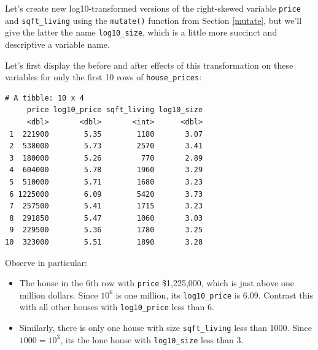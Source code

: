 \documentclass[12pt, krantz2,]{krantz}
\makeatletter
\newenvironment{Shaded}{\begin{snugshade}}{\end{snugshade}}
\newcommand{\DataTypeTok}[1]{\textcolor[rgb]{0.27,0.27,0.27}{#1}}
\newcommand{\KeywordTok}[1]{\textcolor[rgb]{0.27,0.27,0.27}{\textbf{#1}}}
\newcommand{\NormalTok}[1]{#1}
\newcommand{\OperatorTok}[1]{\textcolor[rgb]{0.43,0.43,0.43}{\textbf{#1}}}
\newcommand{\StringTok}[1]{\textcolor[rgb]{0.5,0.5,0.5}{#1}}
\providecommand{\tightlist}{%
  \setlength{\itemsep}{0pt}\setlength{\parskip}{0pt}}
\newenvironment{kframe}{%
\medskip{}
\setlength{\fboxsep}{.8em}
 \def\at@end@of@kframe{}%
 \ifinner\ifhmode%
  \def\at@end@of@kframe{\end{minipage}}%
  \begin{minipage}{\columnwidth}%
 \fi\fi%
 \def\FrameCommand##1{\hskip\@totalleftmargin \hskip-\fboxsep
 \colorbox{shadecolor}{##1}\hskip-\fboxsep
     \hskip-\linewidth \hskip-\@totalleftmargin \hskip\columnwidth}%
 \MakeFramed {\advance\hsize-\width
   \@totalleftmargin\z@ \linewidth\hsize
   \@setminipage}}%
 {\par\unskip\endMakeFramed%
 \at@end@of@kframe}
\renewenvironment{Shaded}{\begin{kframe}}{\end{kframe}}
\makeatother
\begin{document}
Let's create new log10-transformed versions of the right-skewed variable \texttt{price} and \texttt{sqft\_living} using the \texttt{mutate()} function from Section \ref{mutate}, but we'll give the latter the name \texttt{log10\_size}, which is a little more succinct and descriptive a variable name.

\begin{Shaded}
\end{Shaded}

Let's first display the before and after effects of this transformation on these variables for only the first 10 rows of \texttt{house\_prices}:

\begin{Shaded}
\end{Shaded}

\begin{verbatim}
# A tibble: 10 x 4
     price log10_price sqft_living log10_size
     <dbl>       <dbl>       <int>      <dbl>
 1  221900        5.35        1180       3.07
 2  538000        5.73        2570       3.41
 3  180000        5.26         770       2.89
 4  604000        5.78        1960       3.29
 5  510000        5.71        1680       3.23
 6 1225000        6.09        5420       3.73
 7  257500        5.41        1715       3.23
 8  291850        5.47        1060       3.03
 9  229500        5.36        1780       3.25
10  323000        5.51        1890       3.28
\end{verbatim}

Observe in particular:

\begin{itemize}
\tightlist
\item
  The house in the 6th row with \texttt{price} \$1,225,000, which is just above one million dollars. Since \(10^6\) is one million, its \texttt{log10\_price} is 6.09. Contrast this with all other houses with \texttt{log10\_price} less than 6.
\item
  Similarly, there is only one house with size \texttt{sqft\_living} less than 1000. Since \(1000 = 10^3\), its the lone house with \texttt{log10\_size} less than 3.
\end{itemize}
\end{document}
